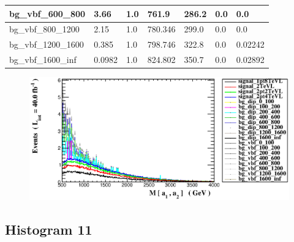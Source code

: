 \documentclass[a4paper, 10pt]{article}
\begin{document}
\begin{table}[H]
\begin{center}
\begin{tabular}{|m{23.0mm}|m{23.0mm}|m{18.0mm}|m{19.0mm}|m{19.0mm}|m{19.0mm}|m{19.0mm}|}
      \hline
      {\cellcolor{white}         bg\_vbf\_600\_800}& {\cellcolor{white}         3.66}& {\cellcolor{white}         1.0}& {\cellcolor{white}         761.9}& {\cellcolor{white}         286.2}& {\cellcolor{green}         0.0}& {\cellcolor{green}         0.0}\\
      \hline
      {\cellcolor{white}         bg\_vbf\_800\_1200}& {\cellcolor{white}         2.15}& {\cellcolor{white}         1.0}& {\cellcolor{white}         780.346}& {\cellcolor{white}         299.0}& {\cellcolor{green}         0.0}& {\cellcolor{green}         0.0}\\
      \hline
      {\cellcolor{white}         bg\_vbf\_1200\_1600}& {\cellcolor{white}         0.385}& {\cellcolor{white}         1.0}& {\cellcolor{white}         798.746}& {\cellcolor{white}         322.8}& {\cellcolor{green}         0.0}& {\cellcolor{green}         0.02242}\\
      \hline
      {\cellcolor{white}         bg\_vbf\_1600\_inf}& {\cellcolor{white}         0.0982}& {\cellcolor{white}         1.0}& {\cellcolor{white}         824.802}& {\cellcolor{white}         350.7}& {\cellcolor{green}         0.0}& {\cellcolor{green}         0.02892}\\
\hline
    \end{tabular}
  \end{center}
\end{table}

\begin{figure}[H]
  \begin{center}
    \includegraphics[scale=0.45]{selection_9.eps}\\
\caption{   }
  \end{center}
\end{figure}
      \newpage
\subsection{ Histogram 11}
\end{document}
